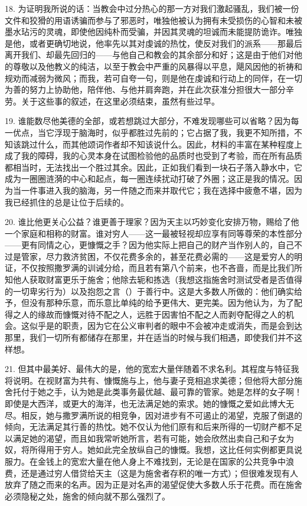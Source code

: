 18. 为证明我所说的话：当教会中过分热心的那一方对我们激起骚乱，我们被一份文件和狡猾的用语诱骗而参与了邪恶时，唯独他被认为拥有未受损伤的心智和未被墨水玷污的灵魂，即使他因纯朴而受骗，并因其灵魂的坦诚而未能提防诡诈。\newline{}唯独是他，或者更确切地说，他率先以其对虔诚的热忱，使反对我们的派系——那最后离开我们、却最先回归的——与他自己和教会的其余部分和好；这是由于他们对他的尊敬以及他教义的纯洁，以至于教会中严重的风暴得以平息，飓风因他的祈祷和规劝而减弱为微风；而我，若可自夸一句，则是他在虔诚和行动上的同伴，在一切为善的努力上协助他，陪伴他、与他并肩奔跑，并在此次获准分担很大一部分辛劳。\newline{}关于这些事的叙述，在这里必须结束，虽然有些过早。\par

19. 谁能数尽他美德的全部，或若想跳过大部分，不难发现哪些可以省略？因为每一优点，当它浮现于脑海时，似乎都胜过先前的；它占据了我，我更不知所措，不知该跳过什么，而其他颂词作者却不知该说什么。因此，材料的丰富在某种程度上成了我的障碍，我的心灵本身在试图检验他的品质时也受到了考验，而在所有品质都相当时，无法找出一个胜过其余。因此，正如我们看到一块石子落入静水中，它成为一圈圈涟漪的中心和起点，每一圈连续扰动打破了外圈；这正是我的情况。因为当一件事进入我的脑海，另一件随之而来并取代它；我在选择中疲惫不堪，因为我已经抓住的总是让位于后续的。\par

20. 谁比他更关心公益？谁更善于理家？因为天主以巧妙变化安排万物，赐给了他一个家庭和相称的财富。谁对穷人——这一最被轻视却应享有同等尊荣的本性部分——更有同情之心，更慷慨之手？因为他实际上把自己的财产当作别人的，自己不过是管家，尽力救济贫困，不仅花费多余的，甚至花费必需的——这是爱穷人的明证，不仅按照撒罗满的训诫分给，而且若有第八个前来，也不吝啬，而是比我们所知他人获取财富更乐于施舍；他除去轭和拣选（我想这指施舍时测试受者是否值得的一切卑劣行为）以及抱怨之言（）于善行中。这是大多数人所做的：他们确实给予，但没有那种乐意，而乐意比单纯的给予更伟大、更完美。因为他认为，为了配得之人的缘故而慷慨对待不配之人，远胜于因害怕不配之人而剥夺配得之人的机会。这似乎是的职责，因为它在公义审判者的眼中不会被冲走或消失，而是会到达那里，我们一切所有都储存在那里，并在适当的时候与我们相遇，即使我们并不这样想。\par

21. 但其中最美好、最伟大的是，他的宽宏大量伴随着不求名利。其程度与特征我将说明。在视财富为共有、慷慨施与上，他与妻子竞相追求美德；但他将大部分施舍托付于她之手，认为她是此类事务最优越、最可靠的管家。她是怎样的女子啊！即使是大西洋，或更大的海洋，也无法满足她的索求。她的慷慨之爱如此博大无尽。相反，她与撒罗满所说的相竞争，因对进步有不可遏止的渴望，克服了倒退的倾向，无法满足其行善的热忱。她不仅认为他们原有和后来所得的一切财产都不足以满足她的渴望，而且如我常听她所言，若有可能，她会欣然出卖自己和子女为奴，将所得用于穷人。她如此完全放纵自己的慷慨。我想，这比任何实例都更具说服力。在金钱上的宽宏大量在他人身上不难找到，无论是在国家的公共竞争中浪费，还是通过穷人借贷给天主（这是为施舍者存积的唯一方式）；但很难发现有人放弃了随之而来的名声。因为正是对名声的渴望促使大多数人乐于花费。而在施舍必须隐秘之处，施舍的倾向就不那么强烈了。\par

